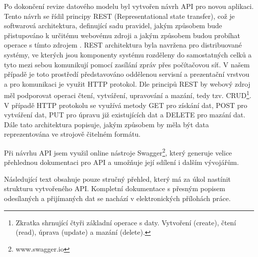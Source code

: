 \documentclass[
  digital, %
  twoside, %
  table,   %
  nolof,     %
  nolot,     %
]{fithesis3}
\begin{document}
Po dokončení revize datového modelu byl vytvořen návrh API pro novou aplikaci. Tento návrh se řídil principy REST (Representational state transfer), což je softwarová architektura, definující sadu pravidel, jakým způsobem bude přistupováno k určitému webovému zdroji a jakým způsobem budou probíhat operace s tímto zdrojem \cite{RoyThomasFielding2000ArchitecturalArchitectures}.
REST architektura byla navržena pro distribuované systémy, ve kterých jsou komponenty systému rozděleny do samostatných celků a tyto mezi sebou komunikují pomocí zasílání zpráv přes počítačovou síť. V našem případě je toto prostředí představováno oddělenou servisní a prezentační vrstvou a pro komunikaci je využit HTTP protokol.  Dle principů REST by webový zdroj měl podporovat operaci čtení, vytváření, upravování a mazání, tedy tzv. CRUD\footnote{Zkratka shrnující čtyři základní operace s daty. Vytvoření (create), čtení (read), úprava (update) a mazání (delete).}. V případě HTTP protokolu se využívá metody GET pro získání dat, POST pro vytváření dat, PUT pro úpravu již existujících dat a DELETE pro mazání dat. Dále tato architektura popisuje, jakým způsobem by měla být data reprezentována ve strojově čitelném formátu. \cite{RoyThomasFielding2000ArchitecturalArchitectures}

Při návrhu API jsem využil online nástroje Swagger\footnote{www.swagger.io}, který generuje velice přehlednou dokumentaci pro API a umožňuje její sdílení i dalším vývojářům.

Následující text obsahuje pouze stručný přehled, který má za úkol nastínit strukturu vytvořeného API. Kompletní dokumentace s přesným popisem odesílaných a přijímaných dat se nachází v elektronických přílohách práce.
\end{document}
